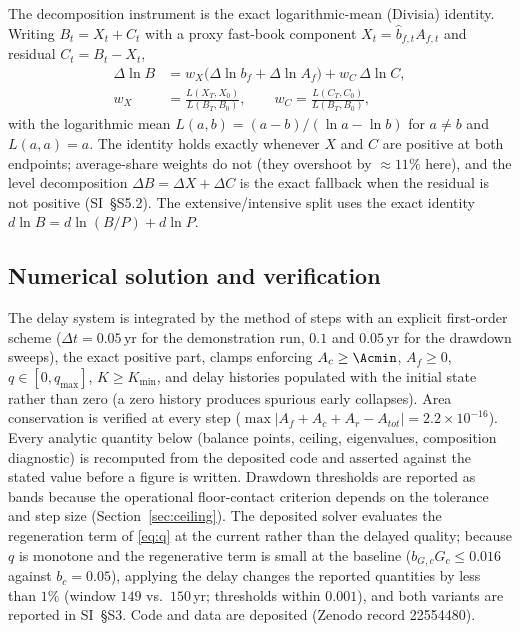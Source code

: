 The decomposition instrument is the exact logarithmic-mean (Divisia) identity. Writing $B_t=X_t+C_t$ with a proxy fast-book component $X_t=\hat b_{f,t}A_{f,t}$ and residual $C_t=B_t-X_t$,
\begin{equation}\label{eq:divisia}
\begin{split}
\Delta\ln B&=w_X\big(\Delta\ln b_f+\Delta\ln A_f\big)+w_C\,\Delta\ln C,\\
w_X&=\frac{L(X_T,X_0)}{L(B_T,B_0)},\qquad w_C=\frac{L(C_T,C_0)}{L(B_T,B_0)},
\end{split}
\end{equation}
with the logarithmic mean $L(a,b)=(a-b)/(\ln a-\ln b)$ for $a\neq b$ and $L(a,a)=a$. The identity holds exactly whenever $X$ and $C$ are positive at both endpoints; average-share weights do not (they overshoot by $\approx11\%$ here), and the level decomposition $\Delta B=\Delta X+\Delta C$ is the exact fallback when the residual is not positive (SI~\S S5.2). The extensive/intensive split uses the exact identity $d\ln B=d\ln(B/P)+d\ln P$.

\subsection{Numerical solution and verification}\label{sec:numerics}

The delay system is integrated by the method of steps with an explicit first-order scheme ($\Delta t=0.05$\,yr for the demonstration run, $0.1$ and $0.05$\,yr for the drawdown sweeps), the exact positive part, clamps enforcing $A_c\ge\Acmin$, $A_f\ge0$, $q\in[0,q_{\max}]$, $K\ge K_{\min}$, and delay histories populated with the initial state rather than zero (a zero history produces spurious early collapses). Area conservation is verified at every step ($\max|A_f+A_c+A_r-A_{tot}|=2.2\times10^{-16}$). Every analytic quantity below (balance points, ceiling, eigenvalues, composition diagnostic) is recomputed from the deposited code and asserted against the stated value before a figure is written. Drawdown thresholds are reported as bands because the operational floor-contact criterion depends on the tolerance and step size (Section~\ref{sec:ceiling}). The deposited solver evaluates the regeneration term of \eqref{eq:q} at the current rather than the delayed quality; because $q$ is monotone and the regenerative term is small at the baseline ($b_{G,c}G_c\le0.016$ against $b_c=0.05$), applying the delay changes the reported quantities by less than $1\%$ (window $149$ vs.\ $150$\,yr; thresholds within $0.001$), and both variants are reported in SI~\S S3. Code and data are deposited (Zenodo record 22554480).

